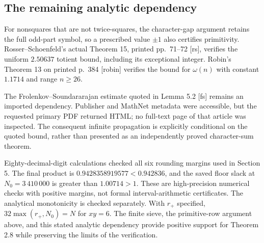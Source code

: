 \documentclass[10pt]{article}
\begin{document}
\subsection*{The remaining analytic dependency}
For nonsquares that are not twice-squares, the character-gap argument retains the full odd-part symbol, so a prescribed value \(\pm1\) also certifies primitivity. Rosser–Schoenfeld’s actual Theorem 15, printed pp. 71–72 [rs], verifies the uniform \(2.50637\) totient bound, including its exceptional integer. Robin’s Theorem 13 on printed p. 384 [robin] verifies the bound for \(\omega(n)\) with constant \(1.1714\) and range \(n\geq26\).\par
The Frolenkov–Soundararajan estimate quoted in Lemma 5.2 [fs] remains an imported dependency. Publisher and MathNet metadata were accessible, but the requested primary PDF returned HTML; no full-text page of that article was inspected. The consequent infinite propagation is explicitly conditional on the quoted bound, rather than presented as an independently proved character-sum theorem.\par
Eighty-decimal-digit calculations checked all six rounding margins used in Section 5. The final product is \(0.9428358919577<0.942836\), and the saved floor slack at \(N_0=3\,410\,000\) is greater than \(1.00714>1\). These are high-precision numerical checks with positive margins, not formal interval-arithmetic certificates. The analytical monotonicity is checked separately. With \(r_+\) specified, \(32\max(r_+,N_0)=N\) for \(xy=6\). The finite sieve, the primitive-row argument above, and this stated analytic dependency provide positive support for Theorem 2.8 while preserving the limits of the verification.\par
\end{document}

